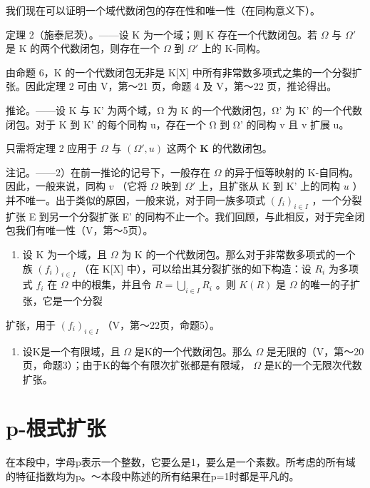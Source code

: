 我们现在可以证明一个域代数闭包的存在性和唯一性（在同构意义下）。

定理 2（施泰尼茨）。——设 K 为一个域；则 K 存在一个代数闭包。若 \(\Omega\) 与 \(\Omega'\) 是 K 的两个代数闭包，则存在一个 \(\Omega\) 到 \(\Omega'\) 上的 K-同构。

由命题 6，K 的一个代数闭包无非是 K{[}X{]} 中所有非常数多项式之集的一个分裂扩张。因此定理 2 可由 V，第～21 页，命题 4 及 V，第～22 页，推论得出。

推论。——设 K 与 K' 为两个域，Ω 为 K 的一个代数闭包，Ω' 为 K' 的一个代数闭包。对于 K 到 K' 的每个同构 u，存在一个 Ω 到 Ω' 的同构 v 且 v 扩展 u。

只需将定理 2 应用于 \(\Omega\) 与 \((\Omega', u)\) 这两个 \(\mathbf{K}\) 的代数闭包。

注记。——2）在前一推论的记号下，一般存在 \(\Omega\) 的异于恒等映射的 K-自同构。因此，一般来说，同构 \(v\) （它将 \(\Omega\) 映到 \(\Omega'\) 上，且扩张从 K 到 K' 上的同构 \(u\) ）并不唯一。出于类似的原因，一般来说，对于同一族多项式 \((f_i)_{i \in I}\) ，一个分裂扩张 E 到另一个分裂扩张 E' 的同构不止一个。我们回顾，与此相反，对于完全闭包我们有唯一性（V，第～5页）。

\begin{enumerate}
\def\labelenumi{\arabic{enumi})}
\setcounter{enumi}{2}
\tightlist
\item
  设 K 为一个域，且 \(\Omega\) 为 K 的一个代数闭包。那么对于非常数多项式的一个族 \((f_{i})_{i\in I}\) （在 K{[}X{]} 中），可以给出其分裂扩张的如下构造：设 \(R_{i}\) 为多项式 \(f_{i}\) 在 \(\Omega\) 中的根集，并且令 \(R=\bigcup_{i\in I}R_{i}\) 。则 \(K(R)\) 是 \(\Omega\) 的唯一的子扩张，它是一个分裂
\end{enumerate}

扩张，用于 \((f_i)_{i\in I}\) （V，第～22页，命题5）。

\begin{enumerate}
\def\labelenumi{\arabic{enumi})}
\setcounter{enumi}{3}
\tightlist
\item
  设K是一个有限域，且 \(\Omega\) 是K的一个代数闭包。那么 \(\Omega\) 是无限的（V，第～20页，命题3）；由于K的每个有限次扩张都是有限域， \(\Omega\) 是K的一个无限次代数扩张。
\end{enumerate}

\section{p-根式扩张}

在本段中，字母p表示一个整数，它要么是1，要么是一个素数。所考虑的所有域的特征指数均为p。～本段中陈述的所有结果在p=1时都是平凡的。

